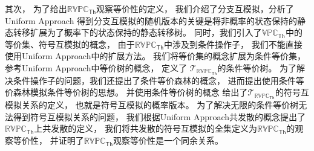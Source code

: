 其次，
为了给出$\mathbb{RVPC}_{\mathsf{Th}}$观察等价性的定义，
我们介绍了分支互模拟，分析了Uniform Approach
得到分支互模拟的随机版本的关键是将非概率的状态保持的静态转移扩展为了概率下的状态保持的静态转移树。
同时，我们引入了$\mathbb{VPC}_{\mathbb{Th}}$中的等价集、符号互模拟的概念，
由于$\mathbb{RVPC}_{\mathsf{Th}}$中涉及到条件操作子，
我们不能直接使用Uniform Approach中的扩展方法。
我们将等价集的概念扩展为条件等价集，
参考Uniform Approach中等价树的概念，
定义了
$\mathcal{T}_{\mathbb{RVPC}_{\mathsf{Th}}}$的条件等价树。
为了解决条件操作子的问题，我们还提出了条件等价森林的概念，
进而提出使用条件等价森林模拟条件等价树的思想。
并使用条件等价树的概念
给出了$\mathcal{T}_{\mathbb{RVPC}_{\mathsf{Th}}}$的符号互模拟关系的定义，
也就是符号互模拟的概率版本。
为了解决无限的条件等价树无法得到符号互模拟关系的问题，
我们根据Uniform Approach共发散的概念提出了$\mathbb{RVPC}_{\mathsf{Th}}$上共发散的定义，
我们将共发散的符号互模拟的全集定义为$\mathbb{RVPC}_{\mathsf{Th}}$的观察等价性，
并证明了$\mathbb{RVPC}_{\mathsf{Th}}$观察等价性是一个同余关系。